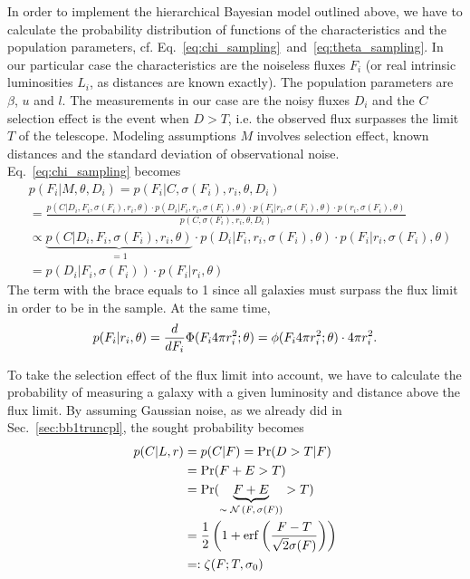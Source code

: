 In order to implement the hierarchical Bayesian model outlined above, we have to calculate the probability distribution of functions of the characteristics and the population parameters, cf. Eq.~\ref{eq:chi_sampling}~and~\ref{eq:theta_sampling}.
In our particular case the characteristics are the noiseless fluxes $F_i$ (or real intrinsic luminosities $L_i$, as distances are known exactly).
The population parameters are $\beta$, $u$ and $l$.
The measurements in our case are the noisy fluxes $D_i$ and the $C$ selection effect is the event when $D > T$, i.e. the observed flux surpasses the limit $T$ of the telescope.
Modeling assumptions $M$ involves selection effect, known distances and the standard deviation of observational noise.
Eq.~\ref{eq:chi_sampling} becomes
\begin{align}
& p(F_{i} | M, \theta, D_{i})=p(F_{i} | C, \sigma(F_{i}), r_{i}, \theta, D_{i})\\
& =\frac{p(C | D_{i}, F_{i}, \sigma(F_{i}), r_{i}, \theta)\cdot p(D_{i} | F_{i}, r_{i}, \sigma(F_{i}), \theta)\cdot p(F_{i} | r_{i}, \sigma(F_{i}), \theta)\cdot p(r_{i}, \sigma(F_{i}), \theta)}{p(C, \sigma(F_{i}), r_{i}, \theta, D_{i})}\\
& \propto \underbrace{p(C | D_{i}, F_{i}, \sigma(F_{i}), r_{i}, \theta)}_\text{$=1$}\cdot p(D_{i} | F_{i}, r_{i}, \sigma(F_{i}), \theta)\cdot p(F_{i} | r_{i}, \sigma(F_{i}), \theta)\label{eq:chi_est_one_prob}\\
& =p(D_{i} | F_{i}, \sigma(F_{i}))\cdot p(F_{i} | r_{i}, \theta)
\end{align}
The term with the brace equals to 1 since all galaxies must surpass the flux limit in order to be in the sample.
At the same time,
\begin{align}
\label{eq:chi_given_dist_theta} p(F_{i} | r_{i}, \theta) = \frac{d}{dF_{i}}\Phi(F_{i}4\pi r_{i}^{2} ; \theta) = \phi(F_{i}4\pi r_{i}^{2} ; \theta)\cdot 4\pi r_{i}^{2}.
\end{align}

To take the selection effect of the flux limit into account, we have to calculate the probability of measuring a galaxy with a given luminosity and distance above the flux limit.
By assuming Gaussian noise, as we already did in Sec.~\ref{sec:bb1truncpl}, the sought probability becomes
\begin{align}
p(C | L, r) &= p(C | F) = \Pr(D>T | F)\\
&= \Pr(F+E>T)\\
&=\Pr(\underbrace{F + E}_\text{$\sim \mathcal{N}\left(F,\sigma(F)\right)$} > T)\\
&=\frac{1}{2}\left( 1 + \operatorname{erf}\left( \frac{F - T}{\sqrt{2}\sigma(F)} \right) \right)\\
&=:\zeta(F ; T,\sigma_{0})
\label{eq:pclr}
\end{align}

